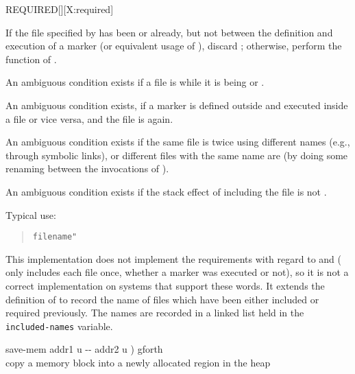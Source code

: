 \newpage
\begin{worddef}{}{REQUIRED}[][X:required]
\item {}

	If the file specified by  has been 
	or  already, but not between the definition and
	execution of a marker (or equivalent usage of ),
	discard ; otherwise, perform the function of
	.

	An ambiguous condition exists if a file is  while
	it is being  or .

	An ambiguous condition exists, if a marker is defined outside and
	executed inside a file or vice versa, and the file is
	 again.

	An ambiguous condition exists if the same file is 
	twice using different names (e.g., through symbolic links), or
	different files with the same name are  (by doing
	some renaming between the invocations of ).

	An ambiguous condition exists if the stack effect of including the
	file is not .

\see {}

	\begin{rationale} %
		Typical use:
		\begin{quote}
			 \texttt{filename"} 
		\end{quote}
	\end{rationale}

	\begin{implement}
		\dffamily
		This implementation does not implement the requirements with
		regard to  and  (
		only includes each file once, whether a marker was executed or
		not), so it is not a correct implementation on systems that
		support these words. It extends the definition of 
		to record the name of files which have been either included or
		required previously. The names are recorded in a linked list
		held in the \texttt{included-names} variable.

		\ttfamily
		\word{:} save-mem	 addr1 u -{}- addr2 u )  gforth \\
		 copy a memory block into a newly allocated region in the heap \\
		\tab {}  \\
		\tab {}   \\
		\tab {}   \word{ROT}   \word{;} \\


\end{implement}
\end{worddef}
